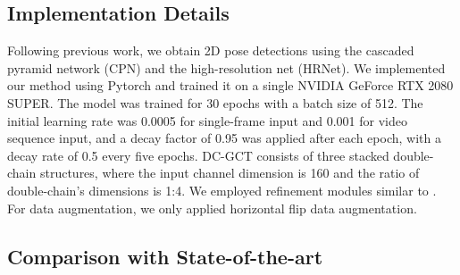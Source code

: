 \documentclass[journal]{IEEEtran}
\begin{document}
\subsection{Implementation Details}
Following previous work\cite{cai2019exploiting,zou2021modulated,cai2023htnet,hassan2023regular}, we obtain 2D pose detections using the cascaded pyramid network (CPN)\cite{chen2018cascaded} and the high-resolution net (HRNet)\cite{sun2019deep}. We implemented our method using Pytorch \cite{paszke2019pytorch} and trained it on a single NVIDIA GeForce RTX 2080 SUPER. The model was trained for 30 epochs with a batch size of 512. The initial learning rate was 0.0005 for single-frame input and 0.001 for video sequence input, and a decay factor of 0.95 was applied after each epoch, with a decay rate of 0.5 every five epochs. DC-GCT consists of three stacked double-chain structures, where the input channel dimension is 160 and the ratio of double-chain's dimensions is 1:4. We employed refinement modules similar to \cite{cai2019exploiting,zou2021modulated}. For data augmentation, we only applied horizontal flip data augmentation.


\subsection{Comparison with State-of-the-art}
\end{document}
